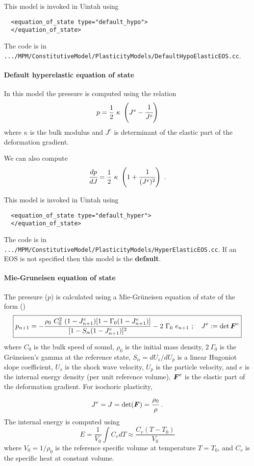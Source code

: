 This model is invoked in Uintah using
\begin{verbatim}
  <equation_of_state type="default_hypo">
  </equation_of_state>
\end{verbatim}
The code is in \verb|.../MPM/ConstitutiveModel/PlasticityModels/DefaultHypoElasticEOS.cc|.

\paragraph{Default hyperelastic equation of state}
In this model the pressure is computed using the relation
\begin{equation}
  p = \Half~\kappa~\left(J^e - \cfrac{1}{J^e}\right)
\end{equation}
where $\kappa$ is the bulk modulus and $J^e$ is determinant of the elastic 
part of the deformation gradient.

We can also compute
\begin{equation}
  \Deriv{p}{J} = \Half~\kappa~\left(1 + \cfrac{1}{(J^e)^2}\right) ~.
\end{equation}

This model is invoked in Uintah using
\begin{verbatim}
  <equation_of_state type="default_hyper">
  </equation_of_state>
\end{verbatim}
The code is in \verb|.../MPM/ConstitutiveModel/PlasticityModels/HyperElasticEOS.cc|.  If an EOS is not specified then this model is the {\bf default}.

\paragraph{Mie-Gruneisen equation of state}
The pressure ($p$) is calculated using a Mie-Gr{\"u}neisen equation of state 
of the form (\cite{Wilkins99,Zocher00})
\begin{equation} \label{eq:EOSMG_upd}
  \boxed{
  p_{n+1} =  - \frac{\rho_0~C_0^2~(1 - J^e_{n+1})
           [1 - \Gamma_0 (1 - J^e_{n+1})]}
           {[1 - S_{\alpha}(1 - J^e_{n+1})]^2} - 2~\Gamma_0~e_{n+1} 
  ~;~~~ J^e := \det{\BF^e} 
  }
\end{equation}
where $C_0$ is the bulk speed of sound, $\rho_0$ is the initial mass density,
$2~\Gamma_0$ is the Gr{\"u}neisen's gamma at the reference state,
$S_{\alpha} = dU_s/dU_p$ is a linear Hugoniot slope coefficient,
$U_s$ is the shock wave velocity, $U_p$ is the particle velocity, and
$e$ is the internal energy density (per unit reference volume), $\BF^e$ is
the elastic part of the deformation gradient.  For isochoric plasticity,
\begin{equation*}
  J^e = J = \det(\BF) = \cfrac{\rho_0}{\rho} ~.
\end{equation*}
  The internal energy is computed using
  \begin{equation}
    E = \frac{1}{V_0} \int C_v dT \approx \frac{C_v (T-T_0)}{V_0}
  \end{equation}
  where $V_0 = 1/\rho_0$ is the reference specific volume at temperature 
  $T = T_0$, and $C_v$ is the specific heat at constant volume.


